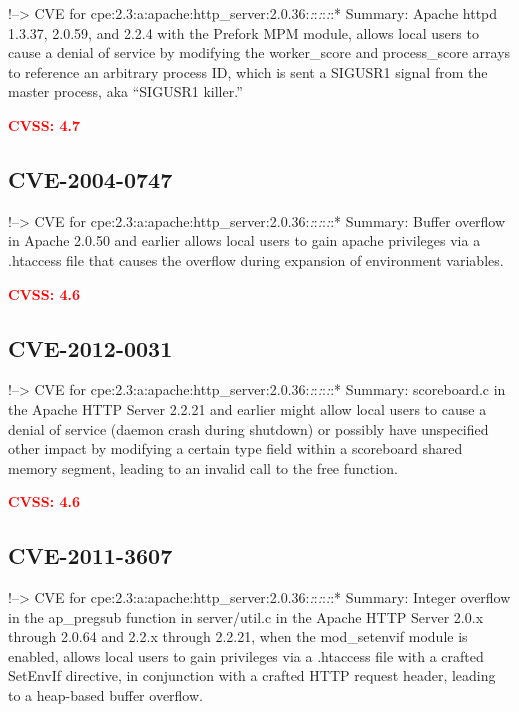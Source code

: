 \documentclass[a4paper, 12pt]{article}
\begin{document}
!--\textgreater{} CVE for
cpe:2.3:a:apache:http\_server:2.0.36:\emph{:}:\emph{:}:\emph{:}:*
Summary: Apache httpd 1.3.37, 2.0.59, and 2.2.4 with the Prefork MPM
module, allows local users to cause a denial of service by modifying the
worker\_score and process\_score arrays to reference an arbitrary
process ID, which is sent a SIGUSR1 signal from the master process, aka
``SIGUSR1 killer.''

\textbf{\textcolor{red}{CVSS: 4.7}}

\hypertarget{cve-2004-0747}{%
\subsection{CVE-2004-0747}\label{cve-2004-0747}}

!--\textgreater{} CVE for
cpe:2.3:a:apache:http\_server:2.0.36:\emph{:}:\emph{:}:\emph{:}:*
Summary: Buffer overflow in Apache 2.0.50 and earlier allows local users
to gain apache privileges via a .htaccess file that causes the overflow
during expansion of environment variables.

\textbf{\textcolor{red}{CVSS: 4.6}}

\hypertarget{cve-2012-0031}{%
\subsection{CVE-2012-0031}\label{cve-2012-0031}}

!--\textgreater{} CVE for
cpe:2.3:a:apache:http\_server:2.0.36:\emph{:}:\emph{:}:\emph{:}:*
Summary: scoreboard.c in the Apache HTTP Server 2.2.21 and earlier might
allow local users to cause a denial of service (daemon crash during
shutdown) or possibly have unspecified other impact by modifying a
certain type field within a scoreboard shared memory segment, leading to
an invalid call to the free function.

\textbf{\textcolor{red}{CVSS: 4.6}}

\hypertarget{cve-2011-3607}{%
\subsection{CVE-2011-3607}\label{cve-2011-3607}}

!--\textgreater{} CVE for
cpe:2.3:a:apache:http\_server:2.0.36:\emph{:}:\emph{:}:\emph{:}:*
Summary: Integer overflow in the ap\_pregsub function in server/util.c
in the Apache HTTP Server 2.0.x through 2.0.64 and 2.2.x through 2.2.21,
when the mod\_setenvif module is enabled, allows local users to gain
privileges via a .htaccess file with a crafted SetEnvIf directive, in
conjunction with a crafted HTTP request header, leading to a heap-based
buffer overflow.
\end{document}
